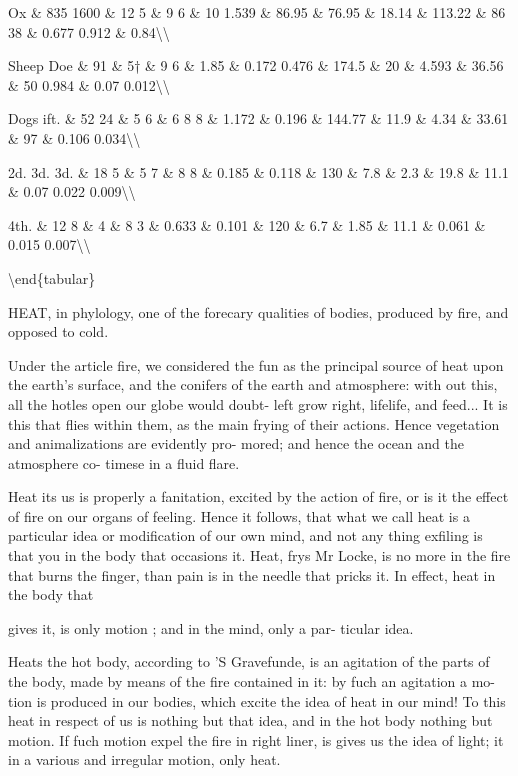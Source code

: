 \documentclass{article}
\begin{document}
Ox \& 835 1600 \& 12 5 \& 9 6 \& 10 1.539 \& 86.95 \& 76.95 \& 18.14 \& 113.22 \& 86 38 \& 0.677 0.912 \& 0.84\textbackslash{}\textbackslash{}

Sheep Doe \& 91 \& 5† \& 9 6 \& 1.85 \& 0.172 0.476 \& 174.5 \& 20 \& 4.593 \& 36.56 \& 50 0.984 \& 0.07 0.012\textbackslash{}\textbackslash{}

Dogs ift. \& 52 24 \& 5 6 \& 6 8 8 \& 1.172 \& 0.196 \& 144.77 \& 11.9 \& 4.34 \& 33.61 \& 97 \& 0.106 0.034\textbackslash{}\textbackslash{}

2d. 3d. 3d. \& 18 5 \& 5 7 \& 8 8 \& 0.185 \& 0.118 \& 130 \& 7.8 \& 2.3 \& 19.8 \& 11.1 \& 0.07 0.022 0.009\textbackslash{}\textbackslash{}

4th. \& 12 8 \& 4 \& 8 3 \& 0.633 \& 0.101 \& 120 \& 6.7 \& 1.85 \& 11.1 \& 0.061 \& 0.015 0.007\textbackslash{}\textbackslash{}

\textbackslash{}end\{tabular\}

HEAT, in phylology, one of the forecary qualities of bodies, produced by fire, and opposed to cold.

Under the article fire, we considered the fun as the principal source of heat upon the earth's surface, and the conifers of the earth and atmosphere: with out this, all the hotles open our globe would doubt- left grow right, lifelife, and feed... It is this that flies within them, as the main frying of their actions. Hence vegetation and animalizations are evidently pro- mored; and hence the ocean and the atmosphere co- timese in a fluid flare.

Heat its us is properly a fanitation, excited by the action of fire, or is it the effect of fire on our organs of feeling. Hence it follows, that what we call heat is a particular idea or modification of our own mind, and not any thing exfiling is that you in the body that occasions it. Heat, frys Mr Locke, is no more in the fire that burns the finger, than pain is in the needle that pricks it. In effect, heat in the body that

gives it, is only motion ; and in the mind, only a par- ticular idea.

Heats the hot body, according to 'S Gravefunde, is an agitation of the parts of the body, made by means of the fire contained in it: by fuch an agitation a mo- tion is produced in our bodies, which excite the idea of heat in our mind! To this heat in respect of us is nothing but that idea, and in the hot body nothing but motion. If fuch motion expel the fire in right liner, is gives us the idea of light; it in a various and irregular motion, only heat.
\end{document}
